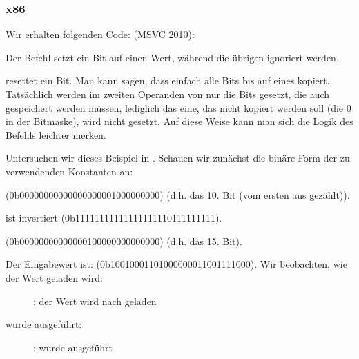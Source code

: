 \subsubsection{x86}


Wir erhalten folgenden Code: (MSVC 2010):



Der \OR Befehl setzt ein Bit auf einen Wert, während die übrigen ignoriert werden.

\AND resettet ein Bit. Man kann sagen, dass \AND einfach alle Bits bis auf eines
kopiert. Tatsächlich werden im zweiten Operanden von \AND nur die Bits gesetzt,
die auch gespeichert werden müssen, lediglich das eine, das nicht kopiert werden
soll (die 0 in der Bitmaske), wird nicht gesetzt.
Auf diese Weise kann man sich die Logik des Befehls leichter merken.

\clearpage
\mysubparagraph{\olly}

Untersuchen wir dieses Beispiel in \olly.
Schauen wir zunächst die binäre Form der zu verwendenden Konstanten an:

 (0b0000000000000000000{\color{red}1}000000000) (d.h. das 10. Bit
(vom ersten aus gezählt)).

 ist invertiert 
(0b1111111111111111111{\color{red}0}111111111).

 (0b00000000000000{\color{red}1}00000000000000) (d.h. das 15. Bit).

Der Eingabewert ist:  (0b10010001101000000011001111000).
Wir beobachten, wie der Wert geladen wird:

\begin{figure}[H]
\centering
{}
\caption{\olly: der Wert wird nach \ECX geladen}
\label{fig:set_reset_olly1}
\end{figure}

\clearpage
\OR wurde ausgeführt:

\begin{figure}[H]
\centering
{}
\caption{\olly: \OR wurde ausgeführt}
\label{fig:set_reset_olly2}
\end{figure}

